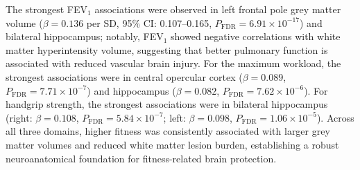 \documentclass{article}
\begin{document}
The strongest FEV$_1$ associations were observed in left frontal pole grey 
matter volume ($\beta = 0.136$ per SD, 95\% CI: 0.107--0.165, 
$P_{\text{FDR}} = 6.91 \times 10^{-17}$) and bilateral hippocampus; 
notably, FEV$_1$ showed negative correlations with white matter hyperintensity 
volume, suggesting that better pulmonary function is associated with reduced 
vascular brain injury.
For the maximum workload, the strongest associations were in central 
opercular cortex ($\beta = 0.089$, $P_{\text{FDR}} = 7.71 \times 10^{-7}$) 
and hippocampus ($\beta = 0.082$, $P_{\text{FDR}} = 7.62 \times 10^{-6}$).
For handgrip strength, the strongest associations were in bilateral hippocampus 
(right: $\beta = 0.108$, $P_{\text{FDR}} = 5.84 \times 10^{-7}$; left: 
$\beta = 0.098$, $P_{\text{FDR}} = 1.06 \times 10^{-5}$).
Across all three domains, higher fitness was consistently associated with 
larger grey matter volumes and reduced white matter lesion burden, 
establishing a robust neuroanatomical foundation for fitness-related brain 
protection.
\end{document}
